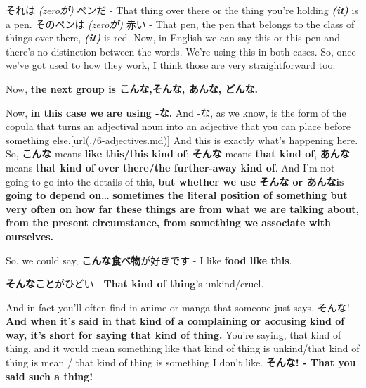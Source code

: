 {}

それは {\em (zeroが)} ペンだ - That thing over there or the thing you're holding {\bf {\em (it)}} is a pen. そのペンは {\em (zeroが)} 赤い - That pen, the pen that belongs to the class of things over there, {\bf {\em (it)}} is red. Now, in English we can say this or this pen and there's no distinction between the words. We're using this in both cases. So, once we've got used to how they work, I think those are very straightforward too.

\stopsectionlevel

\startsectionlevel[title={こんな, そんな, あんな, どんな},reference={こんな-そんな-あんな-どんな}]

Now, {\bf the next group is こんな,そんな, あんな, どんな.}

{}

Now, {\bf in this case we are using -な.} And -な, as we know, is the form of the copula that turns an adjectival noun into an adjective that you can place before something else.\goto{{[}6{]}}[url(./6-adjectives.md)] And this is exactly what's happening here. So, {\bf こんな} means {\bf like this/this kind of}; {\bf そんな} means {\bf that kind of}, {\bf あんな} means {\bf that kind of over there/the further-away kind of}. And I'm not going to go into the details of this, {\bf but whether we use そんな or あんなis going to depend on\ldots{}} {\bf sometimes the literal position of something but very often on how far these things are from what we are talking about, from the present circumstance, from something we associate with ourselves.}

\thinrule

So, we could say, {\bf こんな食べ物}が好きです - I like {\bf food like this}.

{}

{\bf そんなこと}がひどい - {\bf That kind of thing}'s unkind/cruel.

{}

And in fact you'll often find in anime or manga that someone just says, そんな! {\bf And when it's said in that kind of a complaining or accusing kind of way, it's short for saying that kind of thing.} You're saying, that kind of thing, and it would mean something like that kind of thing is unkind/that kind of thing is mean / that kind of thing is something I don't like. {\bf そんな! - That you said such a thing!}

